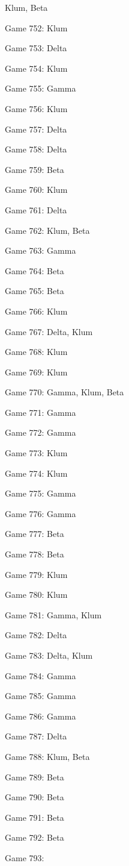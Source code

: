 \documentclass{article}
\begin{document}
\begin{multicols}{3}
\begin{compactitem}
Klum, Beta
\item Game 752:
Klum
\item Game 753:
Delta
\item Game 754:
Klum
\item Game 755:
Gamma
\item Game 756:
Klum
\item Game 757:
Delta
\item Game 758:
Delta
\item Game 759:
Beta
\item Game 760:
Klum
\item Game 761:
Delta
\item Game 762:
Klum, Beta
\item Game 763:
Gamma
\item Game 764:
Beta
\item Game 765:
Beta
\item Game 766:
Klum
\item Game 767:
Delta, Klum
\item Game 768:
Klum
\item Game 769:
Klum
\item Game 770:
Gamma, Klum, Beta
\item Game 771:
Gamma
\item Game 772:
Gamma
\item Game 773:
Klum
\item Game 774:
Klum
\item Game 775:
Gamma
\item Game 776:
Gamma
\item Game 777:
Beta
\item Game 778:
Beta
\item Game 779:
Klum
\item Game 780:
Klum
\item Game 781:
Gamma, Klum
\item Game 782:
Delta
\item Game 783:
Delta, Klum
\item Game 784:
Gamma
\item Game 785:
Gamma
\item Game 786:
Gamma
\item Game 787:
Delta
\item Game 788:
Klum, Beta
\item Game 789:
Beta
\item Game 790:
Beta
\item Game 791:
Beta
\item Game 792:
Beta
\item Game 793:

\end{compactitem}
\end{multicols}
\end{document}
